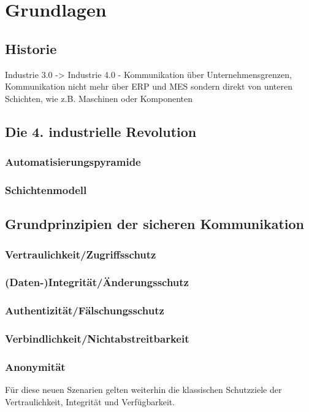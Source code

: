 \chapter{Grundlagen}

\section{Historie}
Industrie 3.0 -> Industrie 4.0 - Kommunikation über Unternehmensgrenzen, Kommunikation nicht mehr über ERP und MES sondern direkt von unteren Schichten, wie z.B. Maschinen oder Komponenten

\section{Die 4. industrielle Revolution}
\subsection{Automatisierungspyramide}
\subsection{Schichtenmodell}

\section{Grundprinzipien der sicheren Kommunikation}
\subsection{Vertraulichkeit/Zugriffsschutz}
\subsection{(Daten-)Integrität/Änderungsschutz}
\subsection{Authentizität/Fälschungsschutz}
\subsection{Verbindlichkeit/Nichtabstreitbarkeit}
\subsection{Anonymität}

Für diese neuen Szenarien gelten weiterhin die klassischen Schutzziele der Vertraulichkeit, Integrität und Verfügbarkeit. 

